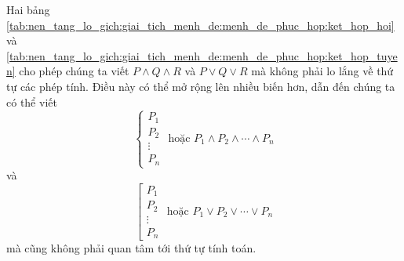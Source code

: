 Hai bảng \ref{tab:nen_tang_lo_gich:giai_tich_menh_de:menh_de_phuc_hop:ket_hop_hoi} và \ref{tab:nen_tang_lo_gich:giai_tich_menh_de:menh_de_phuc_hop:ket_hop_tuyen} cho phép chúng ta viết $P \land Q \land R$ và $P \lor Q \lor R$ mà không phải lo lắng về thứ tự các phép tính. Điều này có thể mở rộng lên nhiều biến hơn, dẫn đến chúng ta có thể viết 
\begin{equation*}
   \left\{ \begin{array}{c}
      P_1 \\
      P_2 \\
      \vdots \\
      P_n
   \end{array} \right. \text{ hoặc } P_1 \land P_2 \land \cdots \land P_n
\end{equation*}
và 
\begin{equation*}
   \left[\begin{array}{c}
      P_1 \\
      P_2 \\
      \vdots\\
      P_n
   \end{array}\right. \text{ hoặc } P_1 \lor P_2 \lor \cdots \lor P_n
\end{equation*}
mà cũng không phải quan tâm tới thứ tự tính toán.

